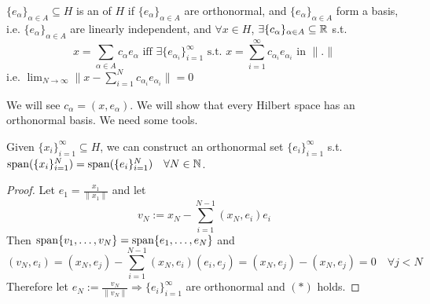 \begin{defn}
    $\{e_\alpha\}_{\alpha \in A} \subseteq H$ is an  of $H$ if 
    $\{e_\alpha \}_{\alpha \in A}$ are orthonormal, and $\{e_\alpha\}_{\alpha \in A}$ form 
    a basis, i.e. $\{e_\alpha\}_{\alpha \in A}$ are linearly independent, and $\forall x \in H$,
    $\exists \{c_\alpha \}_{\alpha \in A} \subseteq \mathbb{R}$ s.t.
    \[
        x = \sum_{\alpha \in A} c_\alpha e_\alpha \text{ iff } \exists 
        \{e_{\alpha_i}\}_{i = 1}^\infty \text{ s.t. } x = \sum_{i = 1}^\infty 
        c_{\alpha_i} e_{\alpha_i} \text{ in } \| . \| 
    \] 
    i.e. $\lim_{N \to \infty} \| x - \sum_{i = 1}^N c_{\alpha_i} e_{\alpha_i} \| = 0$ 
\end{defn}

\begin{rem}
    We will see $c_\alpha = (x, e_\alpha)$. We will show that every Hilbert space
    has an orthonormal basis. We need some tools.
\end{rem}

\begin{thm}
    Given $\{x_{i}\}_{i=1}^{\infty} \subseteq H$, we can construct an orthonormal set 
    $\{e_{i}\}_{i=1}^{\infty} $ s.t. $\operatorname{span} (\{ x_i\}_{i = 1}^N) = 
    \operatorname{span} (\{ e_i\}_{i = 1}^N) \quad \forall N \in \mathbb{N}$.
\end{thm}
\begin{proof}
    Let $e_1 = \frac{x_1}{\| x_1 \|}$ and let 
    \[
    v_N := x_N - \sum_{i =1}^{N-1} (x_N, e_i)e_i
    \]
    Then $\operatorname{span} \{v_1, \dots, v_N \} = \operatorname{span} \{e_1, \dots, e_N \}$ and 
    \[(v_N, e_i) = (x_N, e_j) - \sum_{i = 1}^{N -1} (x_N, e_i)(e_i, e_j) =
    (x_N, e_j) - (x_N, e_j) = 0 \quad \forall j < N\]
    Therefore let $e_N:= \frac{v_N}{\| v_N \| } \Rightarrow \{e_{i}\}_{i=1}^{\infty} $ are
    orthonormal and $(*)$ holds. \qedhere  
\end{proof}


